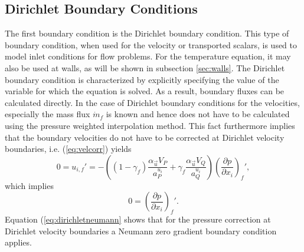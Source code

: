 \subsection{Dirichlet Boundary Conditions}
\label{sec:segDirichlet}

The first boundary condition is the Dirichlet boundary condition. This type of boundary condition, when used for the velocity or transported scalars, is used to model inlet conditions for flow problems. For the temperature equation, it may also be used at walls, as will be shown in subsection \ref{sec:walls}. The Dirichlet boundary condition is characterized by explicitly specifying the value of the variable for which the equation is solved. As a result, boundary fluxes can be calculated directly. In the case of Dirichlet boundary conditions for the velocities, especially the mass flux \(\dot{m}_f\) is known and hence does not have to be calculated using the pressure weighted interpolation method. This fact furthermore implies that the boundary velocities do not have to be corrected at Dirichlet velocity boundaries, i.e. (\ref{eq:velcorr}) yields
\begin{displaymath}
  0 
  =
  u_{i,f}' 
  = 
  - \left(\left(1 - \gamma_f\right) \frac{\alpha_\vec{u} V_P}{a_P^{u_i}} + \gamma_f \frac{\alpha_\vec{u} V_Q}{a_Q^{u_i}}\right)
  \left(\frac{\partial p}{\partial x_i}\right)_f',
\end{displaymath}
which implies
\begin{equation}
  \label{eq:dirichletneumann}
  0 = \left(\frac{\partial p}{\partial x_i}\right)_f'.
\end{equation}
Equation (\ref{eq:dirichletneumann} shows that for the pressure correction at Dirichlet velocity boundaries a Neumann zero gradient boundary condition applies.

